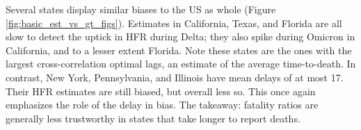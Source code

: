 \documentclass{article}
\begin{document}
Several states display similar biases to the US as whole (Figure
\ref{fig:basic_est_vs_gt_figs}). Estimates in California, Texas, and Florida are 
all slow to detect the uptick in HFR during Delta; they also spike during
Omicron in California, and to a lesser extent Florida. Note these states are the
ones with the largest cross-correlation optimal lags, an estimate of the average 
time-to-death. In contrast, New York, Pennsylvania, and Illinois have mean
delays of at most 17. Their HFR estimates are still biased, but overall less
so. This once again emphasizes the role of the delay in bias. The takeaway:
fatality ratios are generally less trustworthy in states that take longer to
report deaths.         



\end{document}
